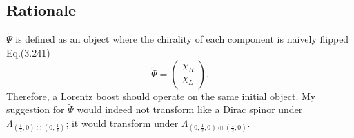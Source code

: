 \documentclass[11pt]{article}
\numberwithin{equation}{section}
\begin{document}
\subsection{Rationale}
$\tilde{\Psi}$ is defined as an object where the chirality of each component is naively flipped Eq.(3.241)
\begin{equation}
\tilde{\Psi} = \begin{pmatrix}
\chi_R \\
\chi_L
\end{pmatrix}.
\end{equation}
\noindent Therefore, a Lorentz boost should operate on the same initial object. My suggestion for $\tilde{\Psi}$ would indeed not transform like a Dirac spinor under $\Lambda_{(\frac{1}{2},0) \oplus (0, \frac{1}{2})}$; it would transform under $\Lambda_{(0, \frac{1}{2},0) \oplus (\frac{1}{2}, 0)}$.

\newpage
\end{document}

